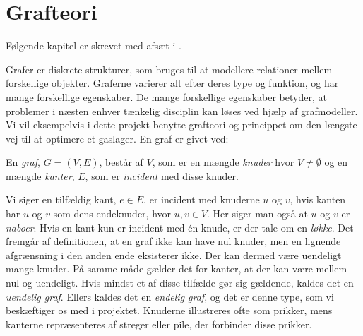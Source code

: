 \chapter{Grafteori} \label{kap:grafteori}
Følgende kapitel er skrevet med afsæt i \citep{dmat}.

Grafer er diskrete strukturer, som bruges til at modellere relationer mellem forskellige objekter.  Graferne varierer alt efter deres type og funktion, og har mange forskellige egenskaber. De mange forskellige egenskaber betyder, at problemer i næsten enhver tænkelig disciplin kan løses ved hjælp af grafmodeller. Vi vil eksempelvis i dette projekt benytte grafteori og princippet om den længste vej til at optimere et gaslager. En graf er givet ved:
\begin{defn}[Graf]
En \emph{graf}, $G = (V,E)$, består af $V$, som er en mængde \emph{knuder} hvor $V \neq \emptyset$ og en mængde \emph{kanter}, $E$, som er \emph{incident} med disse knuder. 
\end{defn}

Vi siger en tilfældig kant, $e \in E$, er incident med knuderne $u$ og $v$, hvis kanten har $u$ og $v$ som dens endeknuder, hvor $u, v \in V$. Her siger man også at $u$ og $v$ er \emph{naboer}. Hvis en kant kun er incident med én knude, er der tale om en \emph{løkke}.
Det fremgår af definitionen, at en graf ikke kan have nul knuder, men en lignende afgrænsning i den anden ende eksisterer ikke. Der kan dermed være uendeligt mange knuder. På samme måde gælder det for kanter, at der kan være mellem nul og uendeligt. Hvis mindst et af disse tilfælde gør sig gældende, kaldes det en \emph{uendelig graf}. Ellers kaldes det en \emph{endelig graf}, og det er denne type, som vi beskæftiger os med i projektet.
Knuderne illustreres ofte som prikker, mens kanterne repræsenteres af streger eller pile, der forbinder disse prikker. 















